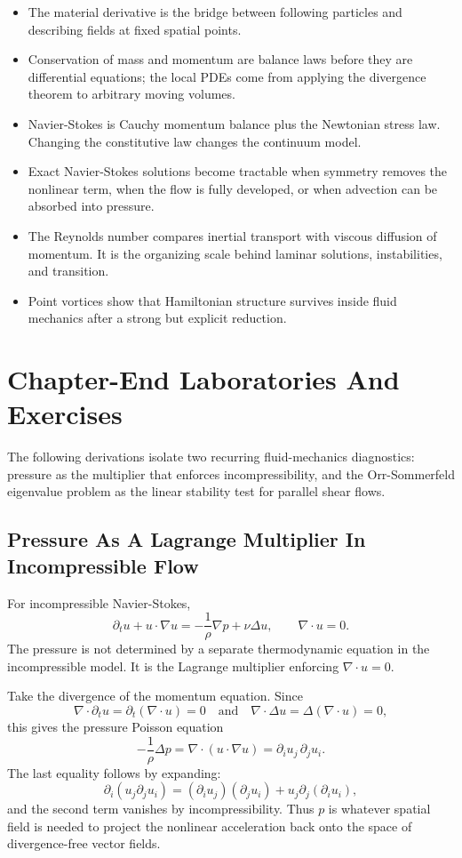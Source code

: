 \begin{itemize}
\item The material derivative is the bridge between following particles and
describing fields at fixed spatial points.
\item Conservation of mass and momentum are balance laws before they are
differential equations; the local PDEs come from applying the divergence theorem
to arbitrary moving volumes.
\item Navier-Stokes is Cauchy momentum balance plus the Newtonian stress law.
Changing the constitutive law changes the continuum model.
\item Exact Navier-Stokes solutions become tractable when symmetry removes the
nonlinear term, when the flow is fully developed, or when advection can be
absorbed into pressure.
\item The Reynolds number compares inertial transport with viscous diffusion of
momentum. It is the organizing scale behind laminar solutions, instabilities,
and transition.
\item Point vortices show that Hamiltonian structure survives inside fluid
mechanics after a strong but explicit reduction.
\end{itemize}

\section{Chapter-End Laboratories And Exercises}
\label{sec:fluid-chapter-end-labs}

The following derivations isolate two recurring fluid-mechanics diagnostics:
pressure as the multiplier that enforces incompressibility, and the
Orr-Sommerfeld eigenvalue problem as the linear stability test for parallel
shear flows.

\subsection{Pressure As A Lagrange Multiplier In Incompressible Flow}
\label{sec:detailed-pressure-multiplier}

For incompressible Navier-Stokes,
\[
  \partial_tu+u\cdot\nabla u
  =
  -\frac1\rho\nabla p+\nu\Delta u,
  \qquad
  \nabla\cdot u=0.
\]
The pressure is not determined by a separate thermodynamic equation in the
incompressible model. It is the Lagrange multiplier enforcing
\(\nabla\cdot u=0\).

Take the divergence of the momentum equation. Since
\[
  \nabla\cdot\partial_tu=\partial_t(\nabla\cdot u)=0
  \quad\text{and}\quad
  \nabla\cdot\Delta u=\Delta(\nabla\cdot u)=0,
\]
this gives the pressure Poisson equation
\[
  \boxed{
  -\frac1\rho\Delta p
  =
  \nabla\cdot(u\cdot\nabla u)
  =
  \partial_i u_j\,\partial_j u_i.
  }
\]
The last equality follows by expanding:
\[
  \partial_i(u_j\partial_j u_i)
  =
  (\partial_i u_j)(\partial_j u_i)
  +
  u_j\partial_j(\partial_i u_i),
\]
and the second term vanishes by incompressibility. Thus \(p\) is whatever
spatial field is needed to project the nonlinear acceleration back onto the
space of divergence-free vector fields.

